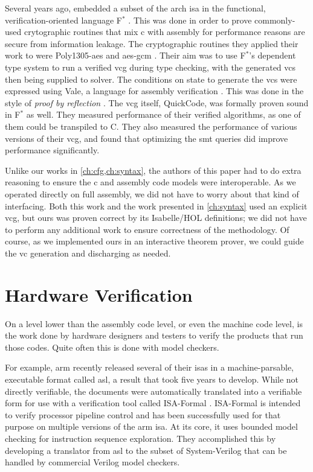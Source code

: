 Several years ago, \textcite{fromherz2019verified} embedded a subset
of the \gls{arch} \ac{isa} in the functional, verification-oriented language
F$^*$ \autocite{fstar}.
This was done in order to prove commonly-used crytographic routines
that mix \gls{c} with assembly for performance reasons are secure from information leakage.
The cryptographic routines they applied their work to were
Poly1305-\ac{aes} \autocite{bernstein2005poly1305} and
\ac{aes}-\ac{gcm} \autocite{dworkin2007recommendation}.
Their aim was to use F$^*$'s dependent type system to run a verified \ac{vcg}
during type checking, with the generated \acp{vc}
then being supplied to  solver.
The conditions on state to generate the \acp{vc} were expressed using Vale,
a language for assembly verification \autocite{bond2017vale}.
This was done in the style of \emph{proof by reflection} \autocite{bertot2004reflection}.
The \ac{vcg} itself, QuickCode, was formally proven sound in F$^*$ as well.
They measured performance of their verified algorithms, as one of them could be
transpiled to C. They also measured the performance of various versions
of their \ac{vcg}, and found that optimizing the \ac{smt} queries did improve performance
significantly.

Unlike our works in \cref{ch:cfg,ch:syntax}, the authors of this paper
had to do extra reasoning to ensure the \gls{c} and assembly code models were interoperable.
As we operated directly on full assembly, we did not have to worry about
that kind of interfacing. Both this work and the work presented in \cref{ch:syntax} used an explicit \ac{vcg},
but ours was proven correct by its Isabelle/HOL definitions;
we did not have to perform any additional work to ensure correctness
of the methodology.
Of course, as we implemented ours in an interactive theorem prover,
we could guide the \ac{vc} generation and discharging as needed.

\section{Hardware Verification}\label{se:hardware}
On a level lower than the assembly code level, or even the machine code level,
is the work done by hardware designers and testers
to verify the products that run those codes.
Quite often this is done with model checkers.

For example, \gls{arm} recently released several of their \acp{isa} in a machine-parsable,
executable format called \ac{asl}, a result that took five years to develop.
While not directly verifiable, the documents were automatically translated into
a verifiable form for use with a verification tool
called ISA-Formal \autocite{reid2016endtoend}.
ISA-Formal is intended to verify processor pipeline control
and has been successfully used for that purpose on multiple versions of the \gls{arm} \ac{isa}.
At its core, it uses bounded model checking for instruction sequence exploration.
They accomplished this by developing a translator from \ac{asl}
to the subset of System-Verilog that can be handled by commercial Verilog model checkers.

